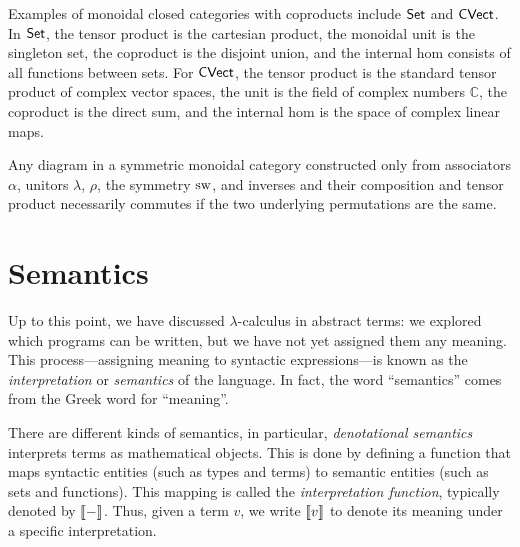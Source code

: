 \begin{example}
Examples of monoidal closed categories with coproducts include $\mathsf{Set}$ and $\mathsf{CVect}$. In $\mathsf{Set}$, the tensor product is the cartesian product, the monoidal unit is the singleton set, the coproduct is the disjoint union, and the internal hom consists of all functions between sets. For $\mathsf{CVect}$, the tensor product is the standard tensor product of complex vector spaces, the unit is the field of complex numbers $\mathbb{C}$, the coproduct is the direct sum, and the internal hom is the space of complex linear maps. %
\end{example}


\begin{theorem} \cite[Section 6.2]{yanofskyMonoidalCategoryTheory2024}
Any diagram in a symmetric monoidal category constructed only from associators $\alpha$, unitors $\lambda$, $\rho$, the symmetry $\mathrm{sw}$, and inverses and their composition and tensor product necessarily commutes if the two underlying permutations are the same.
\end{theorem}


 

 










\section{Semantics} \label{sec: Lambda Calculus:Interpretation}


Up to this point, we have discussed $\lambda$-calculus in abstract terms: we explored which programs can be written, but we have not yet assigned them any meaning. This process—assigning meaning to syntactic expressions—is known as the \emph{interpretation} or \emph{semantics} of the language. In fact, the word ``semantics'' comes from the Greek word for ``meaning''.

There are different kinds of semantics, in particular, \emph{denotational semantics} interprets terms as mathematical objects. This is done by defining a function that maps syntactic entities (such as types and terms) to semantic entities (such as sets and functions). This mapping is called the \emph{interpretation function}, typically denoted by $\left \llbracket - \right \rrbracket$. Thus, given a term $v$, we write $\left \llbracket v \right \rrbracket$ to denote its meaning under a specific interpretation.

